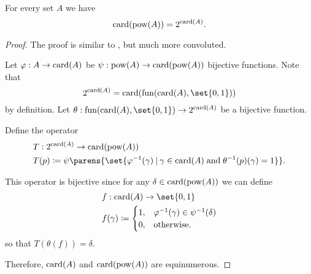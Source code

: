 \begin{proposition}\label{thm:cardinal_exponentiation_power_set}
  For every set \( A \) we have
  \begin{equation*}
    \operatorname{card}(\operatorname{pow}(A)) = 2^{\operatorname{card}(A)}.
  \end{equation*}
\end{proposition}
\begin{proof}
  The proof is similar to , but much more convoluted.

  Let \( \varphi: A \to \operatorname{card}(A) \) be \( \psi: \operatorname{pow}(A) \to \operatorname{card}(\operatorname{pow}(A)) \) bijective functions. Note that
  \begin{equation*}
    2^{\card(A)} = \card(\fun(\card(A), \set{ 0, 1 }))
  \end{equation*}
  by definition. Let \( \theta: \fun(\card(A), \set{ 0, 1 }) \to 2^{\card(A)} \) be a bijective function.

  Define the operator
  \begin{equation*}
    \begin{aligned}
      &T: 2^{\card(A)} \to \card(\pow(A)) \\
      &T(p) \coloneqq \psi\parens{ \set{ \varphi^{-1}(\gamma) \given \gamma \in \card(A) \T{and} \theta^{-1}(p)(\gamma) = 1 } }.
    \end{aligned}
  \end{equation*}

  This operator is bijective since for any \( \delta \in \operatorname{card}(\operatorname{pow}(A)) \) we can define
  \begin{equation*}
    \begin{aligned}
      &f: \card(A) \to \set{ 0, 1 } \\
      &f(\gamma) \coloneqq \begin{cases}
        1, &\varphi^{-1}(\gamma) \in \psi^{-1}(\delta) \\
        0, &\T{otherwise.}
      \end{cases}
    \end{aligned}
  \end{equation*}
  so that \( T(\theta(f)) = \delta \).

  Therefore, \( \operatorname{card}(A) \) and \( \operatorname{card}(\operatorname{pow}(A)) \) are equinumerous.
\end{proof}

